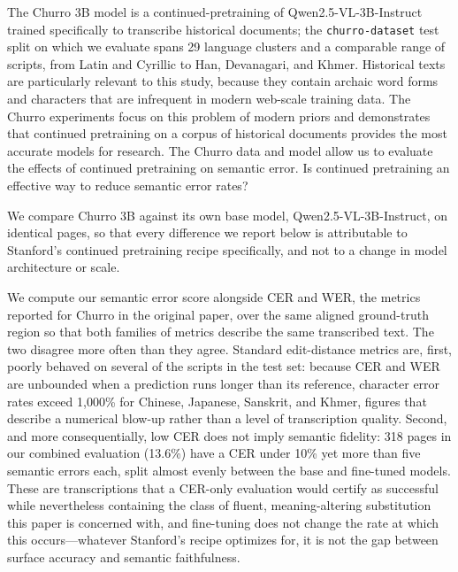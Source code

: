 \documentclass{anthology-ch}         %
\begin{document}
The Churro 3B model is a continued-pretraining of
Qwen2.5-VL-3B-Instruct trained specifically to transcribe historical
documents; the \texttt{churro-dataset} test split on which we evaluate spans
29 language clusters and a comparable range of scripts, from Latin and
Cyrillic to Han, Devanagari, and Khmer. Historical texts are particularly relevant to this study, because they contain archaic word forms and characters that are infrequent in modern web-scale training data. The Churro experiments focus on this problem of modern priors and demonstrates that continued pretraining on a corpus of historical documents provides the most accurate models for research. The Churro data and model allow us to evaluate the effects of continued pretraining on semantic error. Is continued pretraining an effective way to reduce semantic error rates?

We compare Churro 3B against its own base
model, Qwen2.5-VL-3B-Instruct, on identical pages, so that every difference
we report below is attributable to Stanford's continued pretraining recipe specifically,
and not to a change in model architecture or scale.

We compute our semantic error score alongside CER and WER, the metrics
reported for Churro in the original paper, over
the same aligned ground-truth region so that both families of metrics
describe the same transcribed text. The two disagree more often than they
agree. Standard edit-distance metrics are, first, poorly behaved on several
of the scripts in the test set: because CER and WER are unbounded when a
prediction runs longer than its reference, character error rates exceed
1,000\% for Chinese, Japanese, Sanskrit, and Khmer, figures that describe a
numerical blow-up rather than a level of transcription quality. Second, and
more consequentially, low CER does not imply semantic fidelity: 318 pages in
our combined evaluation (13.6\%) have a CER under 10\% yet more than five
semantic errors each, split almost evenly between the base and fine-tuned
models. These are transcriptions that a CER-only evaluation would certify as
successful while nevertheless containing the class of fluent, meaning-altering
substitution this paper is concerned with, and fine-tuning does not change the
rate at which this occurs---whatever Stanford's recipe optimizes for, it is
not the gap between surface accuracy and semantic faithfulness.
\end{document}
